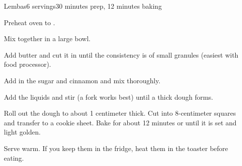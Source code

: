 \documentclass[../Cookbook.tex]{subfiles}
\begin{document}
\begin{recipe}{Lembas}{6 servings}{30 minutes prep, 12 minutes baking}

Preheat oven to .

Mix together in a large bowl.

Add butter and cut it in until the consistency is of small granules (easiest with food processor).

Add in the sugar and cinnamon and mix thoroughly.

Add the liquids and stir (a fork works best) until a thick dough forms.

Roll out the dough to about 1 centimeter thick. Cut into 8-centimeter squares and transfer to a cookie sheet. Bake for about 12 minutes or until it is set and light golden.

Serve warm. If you keep them in the fridge, heat them in the toaster before eating.

\end{recipe}
\end{document}
